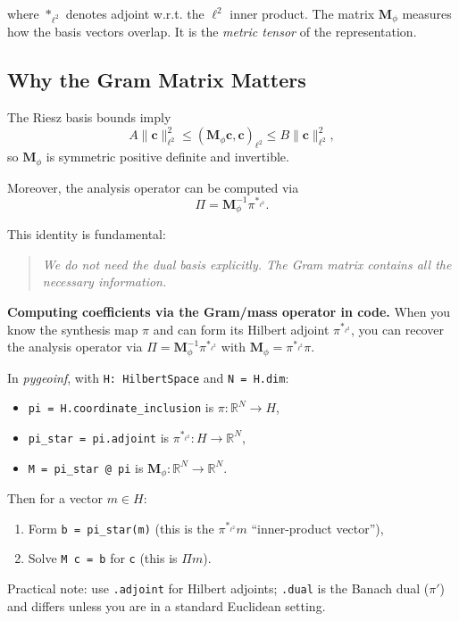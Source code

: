 \documentclass[11pt,twoside,openright]{book}
\theoremstyle{plain}
\theoremstyle{definition}
\theoremstyle{remark}
\begin{document}
where $*_{\ell^2}$ denotes adjoint w.r.t. the $\ell^2$ inner product.  The matrix $\mathbf{M}_\phi$ measures how the basis vectors overlap.
It is the \emph{metric tensor} of the representation.

\subsection{Why the Gram Matrix Matters}

The Riesz basis bounds imply
\[
A \|\mathbf{c}\|_{\ell^2}^2
\le
(\mathbf{M}_\phi \mathbf{c},\mathbf{c})_{\ell^2}
\le
B \|\mathbf{c}\|_{\ell^2}^2,
\]
so $\mathbf{M}_\phi$ is symmetric positive definite and invertible.

Moreover, the analysis operator can be computed via
\begin{equation}
\boxed{
\Pi = \mathbf{M}_\phi^{-1} \pi^{*_{\ell^2}}.
}
\end{equation}

This identity is fundamental:

\begin{quote}
\emph{We do not need the dual basis explicitly.
The Gram matrix contains all the necessary information.}
\end{quote}

\begin{codebox}
\textbf{Computing coefficients via the Gram/mass operator in code.}
When you know the synthesis map $\pi$ and can form its Hilbert adjoint
$\pi^{*_{\ell^2}}$, you can recover the analysis operator via
$\Pi = \mathbf{M}_\phi^{-1}\pi^{*_{\ell^2}}$ with
$\mathbf{M}_\phi = \pi^{*_{\ell^2}}\pi$.

In \textit{pygeoinf}, with \texttt{H: HilbertSpace} and \texttt{N = H.dim}:
\begin{itemize}
  \item \texttt{pi = H.coordinate\_inclusion} is $\pi: \mathbb{R}^N\to H$,
  \item \texttt{pi\_star = pi.adjoint} is $\pi^{*_{\ell^2}}: H\to\mathbb{R}^N$,
  \item \texttt{M = pi\_star @ pi} is $\mathbf{M}_{\phi}:\mathbb{R}^N\to\mathbb{R}^N$.
\end{itemize}
Then for a vector $m\in H$:
\begin{enumerate}
  \item Form \texttt{b = pi\_star(m)} (this is the $\pi^{*_{\ell^2}}m$ ``inner-product vector''),
  \item Solve \texttt{M c = b} for \texttt{c} (this is $\Pi m$).
\end{enumerate}
Practical note: use \texttt{.adjoint} for Hilbert adjoints; \texttt{.dual} is the Banach dual ($\pi'$) and differs unless you are in a standard Euclidean setting.
\end{codebox}
\end{document}
